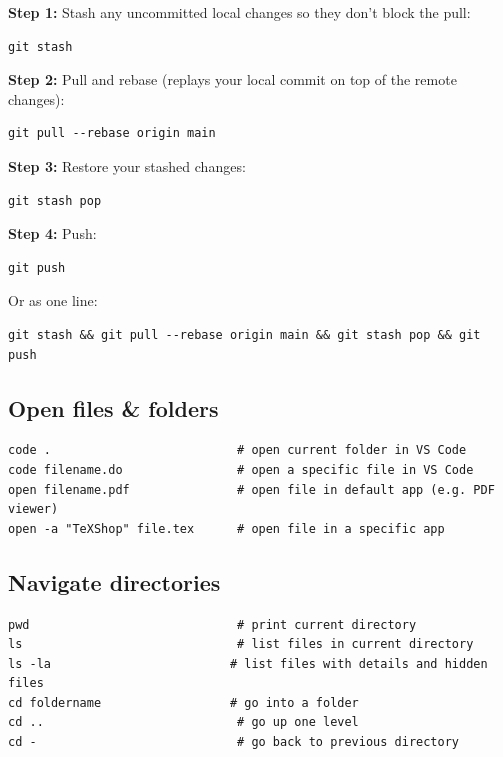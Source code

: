 \documentclass[11pt]{article}
\begin{document}
\textbf{Step 1:} Stash any uncommitted local changes so they don't block the pull:

\begin{lstlisting}[style=bash]
git stash
\end{lstlisting}

\textbf{Step 2:} Pull and rebase (replays your local commit on top of the remote changes):

\begin{lstlisting}[style=bash]
git pull --rebase origin main
\end{lstlisting}

\textbf{Step 3:} Restore your stashed changes:

\begin{lstlisting}[style=bash]
git stash pop
\end{lstlisting}

\textbf{Step 4:} Push:

\begin{lstlisting}[style=bash]
git push
\end{lstlisting}

Or as one line:

\begin{lstlisting}[style=bash]
git stash && git pull --rebase origin main && git stash pop && git push
\end{lstlisting}

\subsection{Open files \& folders}

\begin{lstlisting}[style=bash]
code .                          # open current folder in VS Code
code filename.do                # open a specific file in VS Code
open filename.pdf               # open file in default app (e.g. PDF viewer)
open -a "TeXShop" file.tex      # open file in a specific app
\end{lstlisting}

\subsection{Navigate directories}

\begin{lstlisting}[style=bash]
pwd                             # print current directory
ls                              # list files in current directory
ls -la                         # list files with details and hidden files
cd foldername                  # go into a folder
cd ..                           # go up one level
cd -                            # go back to previous directory
\end{lstlisting}
\end{document}

